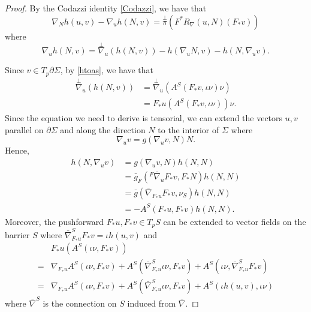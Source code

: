\begin{proof}
    By the Codazzi identity \autoref{Codazzi}, we have that 
    \[\nabla _N h(u,v)-\nabla _u h(N,v)=\overset{\perp }{\pi} (F^*R_{\nabla }(u,N)(F_* v))\]
    where 
    \[\nabla _u h(N,v)=\overset{\perp }{\nabla} _u(h(N,v))-h(\nabla_u N, v)-h(N, \nabla _u v).\]

    Since $v \in T_p \partial \Sigma $, by \autoref{htoas}, we have that
    \begin{equation}
    \begin{split}
        \overset{\perp }{\nabla} _u(h(N,v)) 
    &=  \overset{\perp }{\nabla} _u(A^S(F_{*}v, \iota \nu ) \nu)\\
    &= F_*u(A^S(F_{*}v, \iota \nu )) \nu.
    \end{split}
    \end{equation} 
    Since the equation we need to derive is tensorial, we can extend the vectors $u,v$ parallel on $\partial \Sigma $ and along the direction $N$ to the interior of $\Sigma $ where 
    \[\nabla _u v=g(\nabla _u v,N) N.\]
    Hence,
    \begin{equation}
    \begin{split}
        h(N, \nabla _u v) 
    &= g(\nabla _u v,N) h(N,N)  \\
    &= \bar{g}_F({}^F \bar{\nabla } _u F_* v , F_*N) h(N,N)  \\
    &= \bar{g}(\bar{\nabla } _{F_*u} F_* v , \nu_S)h(N,N)  \\
    &= -A^S(F_*u, F_* v)h(N,N).
    \end{split}
    \end{equation}
    Moreover, the pushforward $F_*u, F_* v \in T_pS$ can be extended to vector fields on the barrier $S$ where $\bar{\nabla }^{S}_{F_*u} F_*v=\iota h(u,v)$ and
    \begin{equation}
    \begin{split}
        &F_*u(A^S(\iota \nu , F_*v)) \\
    =& \nabla _{F_*u}A^S(\iota \nu , F_*v)+A^S(\bar{\nabla }^{S}_{F_*u} \iota \nu , F_*v)+A^S(\iota \nu , \bar{\nabla }^{S}_{F_*u} F_*v)\\
    =& \nabla _{F_*u}A^S(\iota \nu , F_*v)+A^S(\bar{\nabla }^{S}_{F_*u} \iota \nu , F_*v)+A^S(\iota  h(u,v) , \iota \nu )
    \end{split}
    \end{equation}
    where $\bar{\nabla }^{S}$ is the connection on $S$ induced from $\bar{\nabla }$.


\end{proof}
